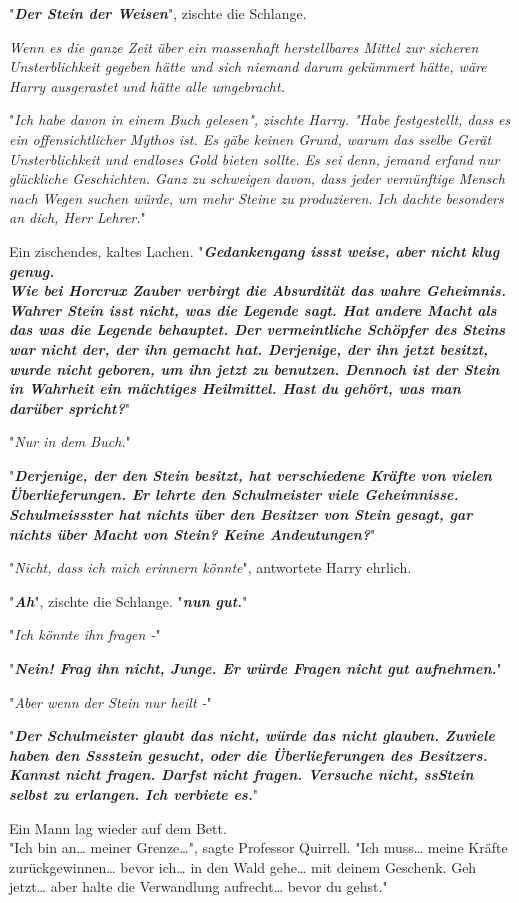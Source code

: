 {"\textbf{\emph{Der Stein der Weisen}}", zischte die Schlange.

\emph{Wenn es die ganze Zeit über ein massenhaft herstellbares Mittel zur sicheren Unsterblichkeit gegeben hätte und sich niemand darum gekümmert hätte, wäre Harry ausgerastet und hätte alle umgebracht.}

"\emph{Ich habe davon in einem Buch gelesen", zischte Harry. "Habe festgestellt, dass es ein offensichtlicher Mythos ist. Es gäbe keinen Grund, warum das sselbe Gerät Unsterblichkeit und endloses Gold bieten sollte. Es sei denn, jemand erfand nur glückliche Geschichten. Ganz zu schweigen davon, dass jeder vernünftige Mensch nach Wegen suchen würde, um mehr Steine zu produzieren. Ich dachte besonders an dich, Herr Lehrer.}"

Ein zischendes, kaltes Lachen. "\textbf{\emph{Gedankengang issst weise, aber nicht klug genug.\\ Wie bei Horcrux Zauber verbirgt die Absurdität das wahre Geheimnis. Wahrer Stein isst nicht, was die Legende sagt. Hat andere Macht als das was die Legende behauptet. Der vermeintliche Schöpfer des Steins war nicht der, der ihn gemacht hat. Derjenige, der ihn jetzt besitzt, wurde nicht geboren, um ihn jetzt zu benutzen. Dennoch ist der Stein in Wahrheit ein mächtiges Heilmittel. Hast du gehört, was man darüber spricht?}}"

"\emph{Nur in dem Buch.}"

"\textbf{\emph{Derjenige, der den Stein besitzt, hat verschiedene Kräfte von vielen Überlieferungen. Er lehrte den Schulmeister viele Geheimnisse. Schulmeissster hat nichts über den Besitzer von Stein gesagt, gar nichts über Macht von Stein? Keine Andeutungen?}}"

"\emph{Nicht, dass ich mich erinnern könnte}", antwortete Harry ehrlich.

"\textbf{\emph{Ah}}", zischte die Schlange. "\textbf{\emph{nun gut.}}"

"\emph{Ich könnte ihn fragen -}"

"\textbf{\emph{Nein! Frag ihn nicht, Junge. Er würde Fragen nicht gut aufnehmen.}}"

"\emph{Aber wenn der Stein nur heilt -}"

"\textbf{\emph{Der Schulmeister glaubt das nicht, würde das nicht glauben. Zuviele haben den Sssstein gesucht, oder die Überlieferungen des Besitzers. Kannst nicht fragen. Darfst nicht fragen. Versuche nicht, ssStein selbst zu erlangen. Ich verbiete es.}}"

Ein Mann lag wieder auf dem Bett.\\ "Ich bin an… meiner Grenze…", sagte Professor Quirrell. "Ich muss… meine Kräfte zurückgewinnen… bevor ich… in den Wald gehe… mit deinem Geschenk. Geh jetzt… aber halte die Verwandlung aufrecht… bevor du gehst."

}
